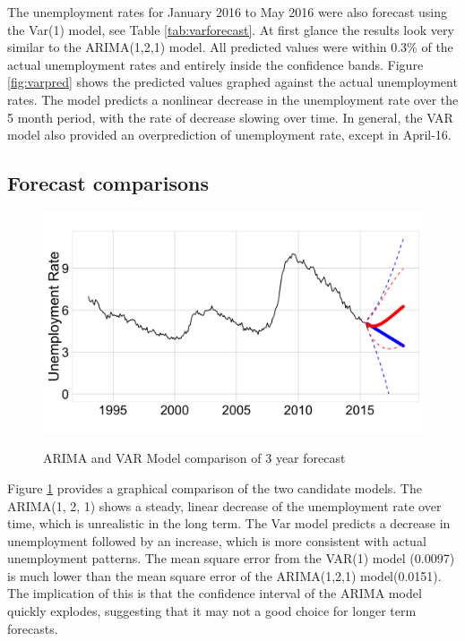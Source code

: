 \documentclass[twoside,twocolumn]{article}
\begin{document}
The unemployment rates for January 2016 to May 2016 were also forecast using the Var(1) model, see Table \ref{tab:varforecast}.  At first glance the results look very similar to the ARIMA(1,2,1) model. All predicted values were within 0.3\% of the actual unemployment rates and entirely inside the confidence bands.  Figure \ref{fig:varpred} shows the predicted values graphed against the actual unemployment rates. The model predicts a nonlinear decrease in the unemployment rate over the 5 month period, with the rate of decrease slowing over time.  In general, the VAR model also provided an overprediction of unemployment rate, except in April-16.

 \subsection{Forecast comparisons}
    \begin{figure}[htb]
    	\centering
     	\caption{ARIMA and VAR Model comparison of 3 year  forecast}
     	\includegraphics[width=\linewidth]{images/arimavarforecast}
     	\label{fig:arimavarforecast}
 \end{figure}


      Figure \ref{fig:arimavarforecast} provides a graphical comparison of the two candidate models.  The ARIMA(1, 2, 1) shows a steady, linear decrease of the unemployment rate over time, which is unrealistic in the long term.  The Var model predicts a decrease in unemployment followed by an increase, which is more consistent with actual unemployment patterns. The mean square error from the VAR(1) model (0.0097) is much lower than the mean square error of the ARIMA(1,2,1) model(0.0151). The implication of this is that  the confidence interval of the ARIMA model quickly explodes, suggesting that it may not a good choice for longer term forecasts.
\end{document}
